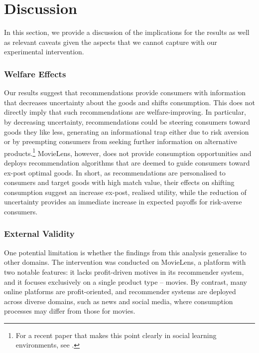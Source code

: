 \documentclass[12pt]{article}
\theoremstyle{newtheorem}
\begin{document}
\section{Discussion}
\label{section:discussion}

In this section, we provide a discussion of the implications for the results as well as relevant caveats given the aspects that we cannot capture with our experimental intervention.

\subsubsection{Welfare Effects} 
Our results suggest that recommendations provide consumers with information that decreases uncertainty about the goods and shifts consumption. 
This does not directly imply that such recommendations are welfare-improving. 
In particular, by decreasing uncertainty, recommendations could be steering consumers toward goods they like less, generating an informational trap either due to risk aversion or by preempting consumers from seeking further information on alternative products.\footnote{
    For a recent paper that makes this point clearly in social learning environments, see \citet{HoezelmannMansoNagarajTranchero2024WP}.
} 
MovieLens, however, does not provide consumption opportunities and deploys recommendation algorithms that are deemed to guide consumers toward ex-post optimal goods.
In short, as recommendations are personalised to consumers and target goods with high match value, their effects on shifting consumption suggest an increase ex-post, realised utility, while the reduction of uncertainty provides an immediate increase in expected payoffs for risk-averse consumers.


\subsubsection{External Validity} 
One potential limitation is whether the findings from this analysis generalise to other domains. 
The intervention was conducted on MovieLens, a platform with two notable features: it lacks profit-driven motives in its recommender system, and it focuses exclusively on a single product type -- movies. 
By contrast, many online platforms are profit-oriented, and recommender systems are deployed across diverse domains, such as news and social media, where consumption processes may differ from those for movies.
\end{document}
